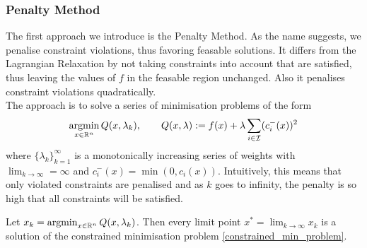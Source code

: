 \subsubsection{Penalty Method}
The first approach we introduce is the Penalty Method. As the name suggests, we penalise constraint violations, thus favoring feasable solutions. It differs from the Lagrangian Relaxation by not taking constraints into account that are satisfied, thus leaving the values of $f$ in the feasable region unchanged. Also it penalises constraint violations quadratically.\\
\indent The approach is to solve a series of minimisation problems of the form
\[\operatorname*{argmin}_{x \in \mathbb{R}^n} Q(x, \lambda_k), \qquad Q(x, \lambda) := f(x) + \lambda \sum_{i \in \mathcal{I}} (c_i^{-}(x))^2\]
where $\{\lambda_k\}_{k=1}^\infty$ is a monotonically increasing series of weights with $\lim_{k \to \infty} = \infty$ and $c_i^-(x) = \min(0, c_i(x))$. Intuitively, this means that only violated constraints are penalised and as $k$ goes to infinity, the penalty is so high that all constraints will be satisfied. 
\begin{theorem}
	Let $x_k = \operatorname*{argmin}_{x \in \mathbb{R}^n} Q(x, \lambda_k)$. Then every limit point $x^* = \lim_{k \to \infty} x_k$ is a solution of the constrained minimisation problem \ref{constrained_min_problem}.
\end{theorem}
